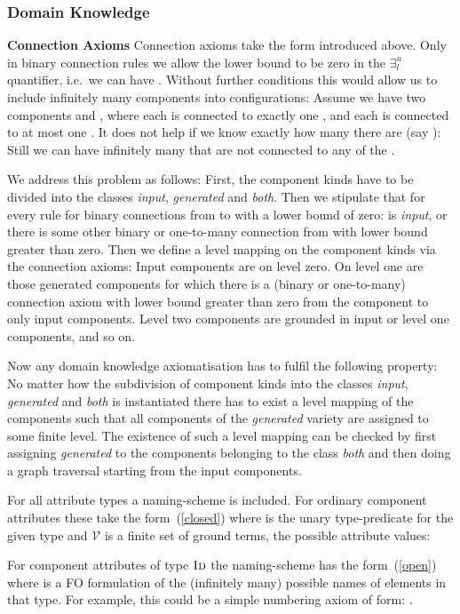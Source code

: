 \documentclass[copyright,creativecommons]{eptcs}
\newcommand{\Vmc}{\ensuremath{\mathcal{V}}\xspace}
\newcommand{\sort}[1]{\ensuremath{\text{\sc #1}}\xspace}
\newcommand{\cex}{\ensuremath{\exists^{u}_{l}}\xspace}
\begin{document}
\subsubsection{Domain Knowledge}

{\noindent \bf Connection Axioms}
Connection axioms take the form introduced above.
Only in binary connection rules we allow the lower bound to be zero in the \cex quantifier, i.e.\ we can have .
Without further conditions this would allow us to include infinitely many components into configurations\/:
Assume we have two components  and , where each  is connected to exactly one , and each  is connected to at most one .
It does not help if we know exactly how many  there are (say )\/: Still we can have infinitely many  that are not connected to any of the .

We address this problem as follows\/:
First, the component kinds have to be divided into the classes {\em input}, {\em generated} and {\em both}.
Then we stipulate that for every rule for binary connections from  to  with a lower bound of zero\/: 
 is {\em input}, or there is some other binary or one-to-many connection from  with lower bound greater than zero. 
Then we define a level mapping on the component kinds via the connection axioms\/:
Input components are on level zero. 
On level one are those generated components for which there is a (binary or one-to-many) connection axiom with lower bound greater than zero from the component to only input components.
Level two components are grounded in input or level one components, and so on.

Now any domain knowledge axiomatisation has to fulfil the following property\/:
No matter how the subdivision of component kinds into the classes {\em input}, {\em generated} and {\em both} is instantiated there has to exist a level mapping of the components such that
all components of the {\em generated} variety are assigned to some finite level. 
The existence of such a level mapping can be checked by first assigning {\em generated} to the components belonging to the class {\em both} and 
then doing a graph traversal starting from the input components.

For all attribute types a naming-scheme is included.
For ordinary component attributes these take the form~(\ref{closed}) where  is the unary type-predicate for the given type and \Vmc is a finite set of ground terms, the possible attribute values\/: 



For component attributes of type \sort{Id} the naming-scheme has the form~(\ref{open}) where  is a FO formulation of the (infinitely many) possible names of elements in that type. For example, this could be a simple numbering axiom of form\/: . 
\end{document}
